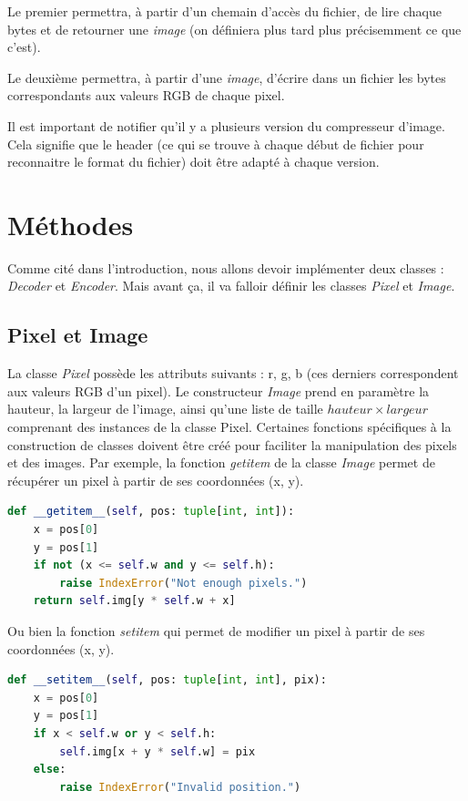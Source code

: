 \documentclass[utf8]{article}
\begin{document}
Le premier permettra, à partir d'un chemain d'accès du fichier, de lire chaque bytes et de retourner une \textit{image} (on définiera plus tard plus précisemment ce que c'est).  

Le deuxième permettra, à partir d'une \textit{image}, d'écrire dans un fichier les bytes correspondants aux valeurs RGB de chaque pixel.

Il est important de notifier qu'il y a plusieurs version du compresseur d'image. Cela signifie que le header (ce qui se trouve à chaque début de fichier pour reconnaitre le format du fichier) doit être adapté à chaque version.


\section{Méthodes}
Comme cité dans l'introduction, nous allons devoir implémenter deux classes : \textit{Decoder} et \textit{Encoder}. Mais avant ça, il va falloir définir les classes \textit{Pixel} et \textit{Image}. 
\subsection{Pixel et Image}
La classe \textit{Pixel} possède les attributs suivants : r, g, b (ces derniers correspondent aux valeurs RGB d'un pixel). 
Le constructeur \textit{Image} prend en paramètre la hauteur, la largeur de l'image, ainsi qu'une liste de taille $hauteur \times largeur$ comprenant des instances de la classe Pixel.
Certaines fonctions spécifiques à la construction de classes doivent être créé pour faciliter la manipulation des pixels et des images. Par exemple, la fonction \textit{getitem} de la classe \textit{Image} permet de récupérer un pixel à partir de ses coordonnées (x, y).

\begin{lstlisting}[language=Python]
def __getitem__(self, pos: tuple[int, int]):
    x = pos[0]
    y = pos[1]
    if not (x <= self.w and y <= self.h):
        raise IndexError("Not enough pixels.")
    return self.img[y * self.w + x]

\end{lstlisting}

Ou bien la fonction \textit{setitem} qui permet de modifier un pixel à partir de ses coordonnées (x, y).
\begin{lstlisting}[language=Python]
 def __setitem__(self, pos: tuple[int, int], pix):
    x = pos[0]
    y = pos[1]
    if x < self.w or y < self.h:
        self.img[x + y * self.w] = pix
    else:
        raise IndexError("Invalid position.")

\end{lstlisting}
\end{document}
